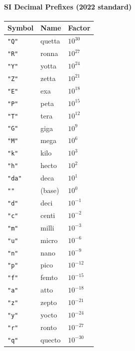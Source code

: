 \paragraph{SI Decimal Prefixes (2022 standard)}
\begin{table}[h]
\centering
\footnotesize
\begin{tabular}{|l|l|l|}
\hline
\textbf{Symbol} & \textbf{Name} & \textbf{Factor} \\
\hline
\texttt{"Q"} & quetta & $10^{30}$ \\
\texttt{"R"} & ronna & $10^{27}$ \\
\texttt{"Y"} & yotta & $10^{24}$ \\
\texttt{"Z"} & zetta & $10^{21}$ \\
\texttt{"E"} & exa & $10^{18}$ \\
\texttt{"P"} & peta & $10^{15}$ \\
\texttt{"T"} & tera & $10^{12}$ \\
\texttt{"G"} & giga & $10^{9}$ \\
\texttt{"M"} & mega & $10^{6}$ \\
\texttt{"k"} & kilo & $10^{3}$ \\
\texttt{"h"} & hecto & $10^{2}$ \\
\texttt{"da"} & deca & $10^{1}$ \\
\texttt{""} & (base) & $10^{0}$ \\
\texttt{"d"} & deci & $10^{-1}$ \\
\texttt{"c"} & centi & $10^{-2}$ \\
\texttt{"m"} & milli & $10^{-3}$ \\
\texttt{"u"} & micro & $10^{-6}$ \\
\texttt{"n"} & nano & $10^{-9}$ \\
\texttt{"p"} & pico & $10^{-12}$ \\
\texttt{"f"} & femto & $10^{-15}$ \\
\texttt{"a"} & atto & $10^{-18}$ \\
\texttt{"z"} & zepto & $10^{-21}$ \\
\texttt{"y"} & yocto & $10^{-24}$ \\
\texttt{"r"} & ronto & $10^{-27}$ \\
\texttt{"q"} & quecto & $10^{-30}$ \\
\hline
\end{tabular}
\end{table}

